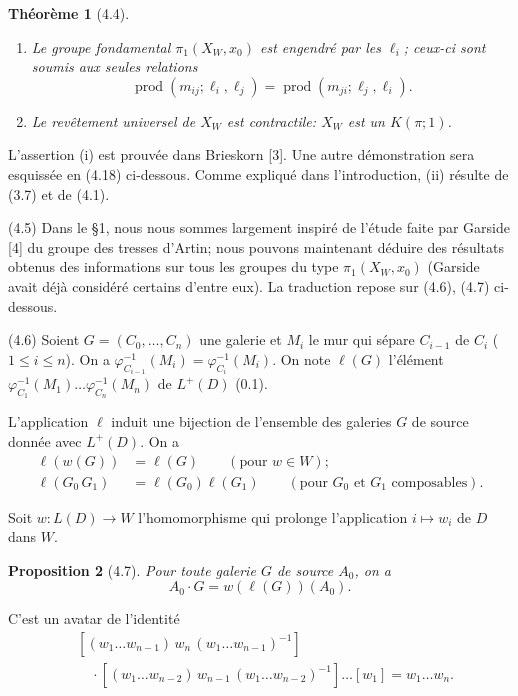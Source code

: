 \documentclass[12pt]{article}
\newtheorem{theoreme}{Théorème}
\newtheorem{proposition}[theoreme]{Proposition}
\theoremstyle{remark}
\begin{document}
\begin{theoreme}[4.4]
\begin{enumerate}
\item[(i)] Le groupe fondamental $\pi_1(X_W, x_0)$ est engendré par les $\ell_i$; ceux-ci sont soumis aux seules relations
\begin{equation}
\operatorname{prod}(m_{ij}; \ell_i, \ell_j) = \operatorname{prod}(m_{ji}; \ell_j, \ell_i).\tag{4.4.1}
\end{equation}
\item[(ii)] Le revêtement universel de $X_W$ est contractile: $X_W$ est un $K(\pi; 1)$.
\end{enumerate}
\end{theoreme}

L'assertion (i) est prouvée dans Brieskorn [3]. Une autre démonstration sera esquissée en (4.18) ci-dessous. Comme expliqué dans l'introduction, (ii) résulte de (3.7) et de (4.1).

(4.5) Dans le \S 1, nous nous sommes largement inspiré de l'étude faite par Garside [4] du groupe des tresses d'Artin; nous pouvons maintenant déduire des résultats obtenus des informations sur tous les groupes du type $\pi_1(X_W, x_0)$ (Garside avait déjà considéré certains d'entre eux). La traduction repose sur (4.6), (4.7) ci-dessous.

(4.6) Soient $G = (C_0, \ldots, C_n)$ une galerie et $M_i$ le mur qui sépare $C_{i-1}$ de $C_i$ ($1 \leq i \leq n$). On a $\varphi_{C_{i-1}}^{-1}(M_i) = \varphi_{C_i}^{-1}(M_i)$. On note $\ell(G)$ l'élément $\varphi_{C_1}^{-1}(M_1) \ldots \varphi_{C_n}^{-1}(M_n)$ de $L^+(D)$ (0.1).

L'application $\ell$ induit une bijection de l'ensemble des galeries $G$ de source donnée avec $L^+(D)$. On a
\begin{align}
\ell(w(G)) &= \ell(G) \qquad (\text{pour } w \in W); \tag{4.6.1} \\
\ell(G_0 \, G_1) &= \ell(G_0) \ell(G_1) \qquad (\text{pour } G_0 \text{ et } G_1 \text{ composables}). \tag{4.6.2}
\end{align}

Soit $w \colon L(D) \to W$ l'homomorphisme qui prolonge l'application $i \mapsto w_i$ de $D$ dans $W$.

\begin{proposition}[4.7]
Pour toute galerie $G$ de source $A_0$, on a
\[A_0 \cdot G = w(\ell(G))(A_0).\]
\end{proposition}

C'est un avatar de l'identité
\begin{align*}&[(w_1 \ldots w_{n-1}) \, w_n \, (w_1 \ldots w_{n-1})^{-1}] \\&\quad \cdot [(w_1 \ldots w_{n-2}) \, w_{n-1} \, (w_1 \ldots w_{n-2})^{-1}] \ldots [w_1] = w_1 \ldots w_n.\end{align*}
\end{document}
